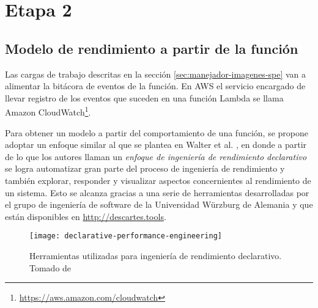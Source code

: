 \section{Etapa 2}

\subsection{Modelo de rendimiento a partir de la función}
Las cargas de trabajo descritas en la sección \ref{sec:manejador-imagenes-spe} van a alimentar la bitácora de eventos de la función. En AWS el servicio encargado de llevar registro de los eventos que suceden en una función Lambda se llama Amazon CloudWatch\footnote{\url{https://aws.amazon.com/cloudwatch}}. 

Para obtener un modelo a partir del comportamiento de una función, se propone adoptar un enfoque similar al que se plantea en Walter et al. \cite{Walter:2018:TDP:3185768.3185777}, en donde a partir de lo que los autores llaman un \emph{enfoque de ingeniería de rendimiento declarativo} se logra automatizar gran parte del proceso de ingeniería de rendimiento y también explorar, responder y visualizar aspectos concernientes al rendimiento de un sistema. Esto se alcanza gracias a una serie de herramientas desarrolladas por el grupo de ingeniería de software de la Universidad Würzburg de Alemania y que están disponibles en \url{http://descartes.tools}.

\begin{figure}[h]
  \centering
  \texttt{[image: declarative-performance-engineering]}
  \caption[Herramientas utilizadas para ingeniería de rendimiento declarativo]{Herramientas utilizadas para ingeniería de rendimiento declarativo. Tomado de \cite{Walter:2018:TDP:3185768.3185777}}
  \label{fig:declarative-performance-engineering}
\end{figure}

